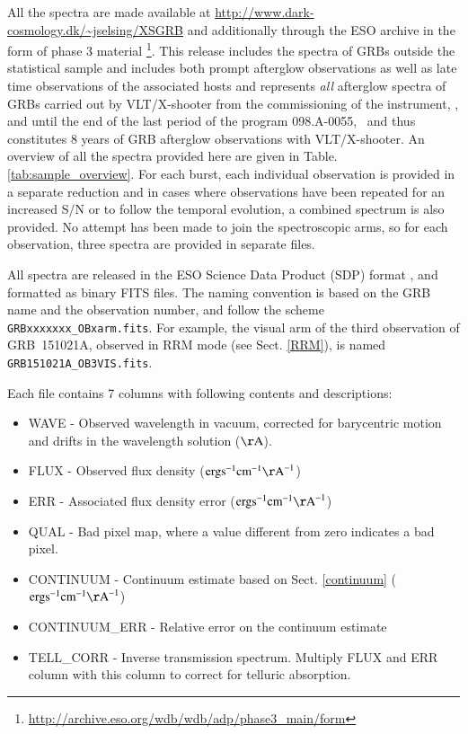 \documentclass{aa}    %
\begin{document}
All the spectra are made available at
\url{http://www.dark-cosmology.dk/~jselsing/XSGRB} and additionally through the
ESO archive in the form of phase 3 material
\footnote{\url{http://archive.eso.org/wdb/wdb/adp/phase3_main/form}}. This
release includes the spectra of GRBs outside the statistical sample and includes
both prompt afterglow observations as well as late time observations of the
associated hosts and represents \textit{all} afterglow spectra of GRBs carried
out by VLT/X-shooter from the commissioning of the instrument, \startdate, and
until the end of the last period of the program 098.A-0055, \termdate~and thus
constitutes 8 years of GRB afterglow observations with VLT/X-shooter. An
overview of all the spectra provided here are given in Table.
\ref{tab:sample_overview}. For each burst, each individual observation is provided
in a separate reduction and in cases where observations have been repeated for
an increased S/N or to follow the temporal evolution, a combined spectrum is
also provided. No attempt has been made to join the spectroscopic arms, so for
each observation, three spectra are provided in separate files.

All spectra are released in the ESO Science Data Product (SDP) format
\citep{Micol2016}, and formatted as binary FITS files. The naming convention is
based on the GRB name and the observation number, and follow the scheme
\texttt{GRBxxxxxxx\_OBxarm.fits}. For example, the visual arm of the third
observation of GRB~151021A, observed in RRM mode (see Sect. \ref{RRM}), is named
\texttt{GRB151021A\_OB3VIS.fits}.

Each file contains 7 columns with following contents and descriptions:
\begin{itemize}
	\item WAVE - Observed wavelength in vacuum, corrected for barycentric motion and drifts in the wavelength solution ($\mathrm{\AA}$).
	\item FLUX - Observed flux density ($\mathrm{erg} \mathrm{s}^{-1} \mathrm{cm}^{-1} \mathrm{\AA}^{-1}$)
	\item ERR - Associated flux density error ($\mathrm{erg} \mathrm{s}^{-1} \mathrm{cm}^{-1} \mathrm{\AA}^{-1}$)
	\item QUAL - Bad pixel map, where a value different from zero indicates a bad pixel.
	\item CONTINUUM - Continuum estimate based on Sect. \ref{continuum} ($\mathrm{erg} \mathrm{s}^{-1} \mathrm{cm}^{-1} \mathrm{\AA}^{-1}$)
	\item CONTINUUM\_ERR - Relative error on the continuum estimate 
	\item TELL\_CORR - Inverse transmission spectrum. Multiply FLUX and ERR column with this column to correct for telluric absorption. 
\end{itemize}
\end{document}

